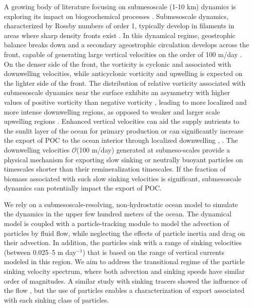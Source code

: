 \documentclass[article,linenumbers]{agujournal2019}
\begin{document}
	A growing body of literature focusing on submesoscale (1-10 km) dynamics is exploring its impact on biogeochemical processes \cite{Levy_2012, Mahadevan_2016}. Submesoscale dynamics, characterized by Rossby numbers of order 1, typically develop in filaments in areas where sharp density fronts exist \cite{Thomas_2013b,Klein_2009,McWilliams_2016}. In this dynamical regime, geostrophic balance breaks down and a secondary ageostrophic circulation develops across the front, capable of generating large vertical velocities on the order of 100 m/day \cite{FoxKemper_2008,Mahadevan_2016}. On the denser side of the front, the vorticity is cyclonic and associated with downwelling velocities, while anticyclonic vorticity and upwelling is expected on the lighter side of the front. The distribution of relative vorticity associated with submesoscale dynamics near the surface exhibits an asymmetry with higher values of positive vorticity than negative vorticity \cite{Rudnick_2001}, leading to more localized and more intense downwelling regions, as opposed to weaker and larger scale upwelling regions \cite{Mahadevan_2006}. Enhanced vertical velocities can aid the supply nutrients to the sunlit layer of the ocean for primary production \cite{Mahadevan_2000,Levy_2001} or can significantly increase the export of POC to the ocean interior through localized downwelling \cite{Levy_2012, Gruber_2011,Estapa_2015,Omand_2015},  \cite{Resplandy_2019}. The downwelling velocities $\mathcal{O}$(100 m/day) generated at submeso-scales provide a physical mechanism for exporting slow sinking or neutrally buoyant particles on timescales shorter than their remineralization timescales. If the fraction of  biomass associated with such slow sinking velocities is significant, submesoscale dynamics can potentially impact the export of POC.

	We rely on a submesoscale-resolving, non-hydrostatic  ocean model to simulate the dynamics in the upper few hundred meters of the ocean. The dynamical model is coupled with a particle-tracking module to model the advection of particles by fluid flow, while neglecting the effects of particle inertia and drag on their advection. In addition, the particles sink with a range of sinking velocities (between 0.025--5 m day$^{-1}$) that is based on the range of vertical currents modeled in this region. We aim to address the transitional regime of the particle sinking velocity spectrum, where both advection and sinking speeds have similar order of magnitudes. A similar study with sinking tracers  showed the influence of the flow \cite{Taylor_2020}, but the use of particles enables a characterization of export associated with each sinking class of particles.
\end{document}
